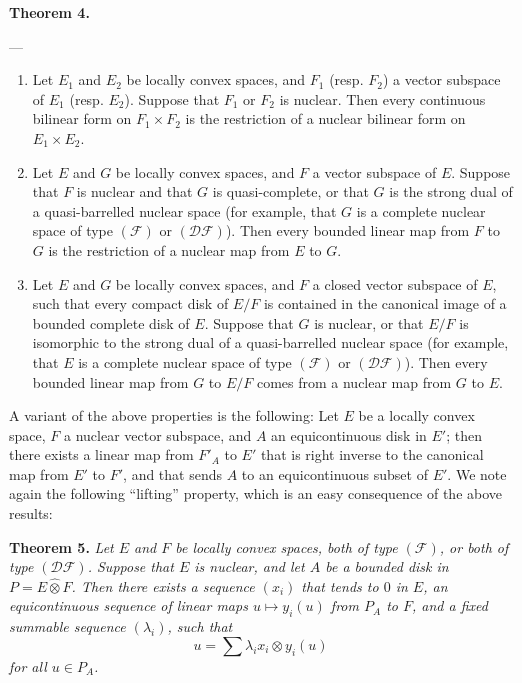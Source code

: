 \documentclass[british]{article}
\newenvironment{itenv}[1]
  {\phantomsection\par\smallskip\noindent\textbf{#1.}\itshape}
  {\par\smallskip}
\newcommand{\oldpage}[1]{\marginpar{\footnotesize$\Big\vert$ \textit{p.~#1}}}
\begin{document}
\protect{}\label{section-2-theorem-4}
\begin{itenv}{Theorem 4}

---

\begin{enumerate}
\def\labelenumi{\arabic{enumi}.}
\item
  Let \(E_1\) and \(E_2\) be locally convex spaces, and \(F_1\) (resp.
  \(F_2\)) a vector subspace of \(E_1\) (resp. \(E_2\)). Suppose that
  \(F_1\) or \(F_2\) is nuclear. Then every continuous bilinear form on
  \(F_1\times F_2\) is the restriction of a nuclear bilinear form on
  \(E_1\times E_2\).
\item
  Let \(E\) and \(G\) be locally convex spaces, and \(F\) a vector
  subspace of \(E\). Suppose that \(F\) is nuclear and that \(G\) is
  quasi-complete, or that \(G\) is the strong dual of a quasi-barrelled
  nuclear space (for example, that \(G\) is a complete nuclear space of
  type \((\mathscr{F})\) or \((\mathscr{DF})\)). Then every bounded
  linear map from \(F\) to \(G\) is the restriction of a nuclear map
  from \(E\) to \(G\).
\item
  Let \(E\) and \(G\) be locally convex spaces, and \(F\) a closed
  vector subspace of \(E\), such that every compact disk of \(E/F\) is
  contained in the canonical image of a bounded complete disk of \(E\).
  Suppose that \(G\) is nuclear, or that \(E/F\) is isomorphic to the
  strong dual of a quasi-barrelled nuclear space (for example, that
  \(E\) is a complete nuclear space of type \((\mathscr{F})\) or
  \((\mathscr{DF})\)). Then every bounded linear map from \(G\) to
  \(E/F\) comes from a nuclear map from \(G\) to \(E\).
\end{enumerate}

\end{itenv}

A variant of the above properties is the following: Let \(E\) be a
locally convex space, \(F\) a nuclear vector subspace, and \(A\) an
equicontinuous disk in \(E'\); then there exists a linear map from
\(F'_A\) to \(E'\) that is right inverse to the canonical map from
\(E'\) to \(F'\), and that sends \(A\) to an equicontinuous subset of
\(E'\). \oldpage{104} We note again the following ``lifting'' property,
which is an easy consequence of the above results:

\protect{}\label{section-2-theorem-5}
\begin{itenv}{Theorem 5}
Let \(E\) and \(F\) be locally convex spaces, both of type
\((\mathscr{F})\), or both of type \((\mathscr{DF})\). Suppose that
\(E\) is nuclear, and let \(A\) be a bounded disk in
\(P=E\hat{\otimes}F\). Then there exists a sequence \((x_i)\) that tends
to \(0\) in \(E\), an equicontinuous sequence of linear maps
\(u\mapsto y_i(u)\) from \(P_A\) to \(F\), and a fixed summable sequence
\((\lambda_i)\), such that \[
  u = \sum \lambda_i x_i\otimes y_i(u)
\] for all \(u\in P_A\).

\end{itenv}
\end{document}
